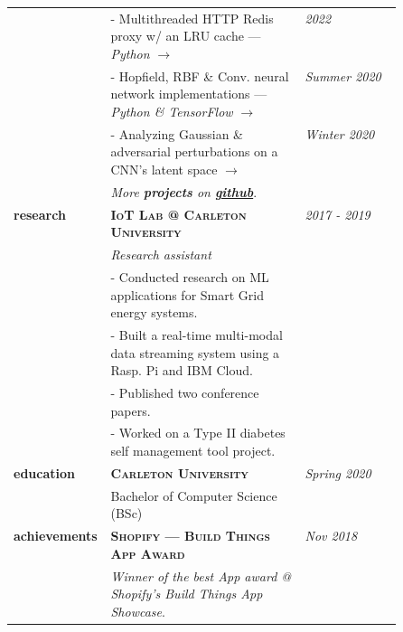 \documentclass[9pt]{article}
\begin{document}
\begin{longtable}{@{}>{\raggedleft}p{0.25\linewidth}
                          p{}>{}p{0.25\linewidth}@{}}
            & - Multithreaded HTTP Redis proxy w/ an LRU cache --- \textit{Python} \href{https://github.com/boshd/rp}{$\rightarrow$} & \textit{2022} \\ [0.5em]

            & - Hopfield, RBF \& Conv. neural network implementations --- \textit{Python \& TensorFlow} \href{https://github.com/boshd/neuralnets}{$\rightarrow$} & \textit{Summer 2020} \\ [0.5em]

            & - Analyzing Gaussian \& adversarial perturbations on a CNN's latent space \href{https://github.com/boshd/advatck}{$\rightarrow$} & \textit{Winter 2020} \\ [0.5em]

            & \textit{More \textbf{projects} on \href{https://github.com/boshd}{\textbf{github}}}.\\ [1em]

        \textbf{research}
            & \textbf{\textsc{IoT Lab @ Carleton University}} & \textit{2017 - 2019} \\
            & \textit{Research assistant} \\
            & - Conducted research on ML applications for Smart Grid energy systems. \\
            & - Built a real-time multi-modal data streaming system using a Rasp. Pi and IBM Cloud. \\
            & - Published two conference papers. \\
            & - Worked on a Type II diabetes self management tool project. \\ [1em]

        \textbf{education}
            & \textbf{\textsc{Carleton University}} & \textit{Spring 2020} \\
            & Bachelor of Computer Science (BSc) \\ [1em]

        \textbf{achievements}
            & \textbf{\textsc{Shopify --- Build Things App Award}} & \textit{Nov 2018} \\
            & \textit{Winner of the best App award @ Shopify's Build Things App Showcase}. \\ [1em]


\end{longtable}
\end{document}
